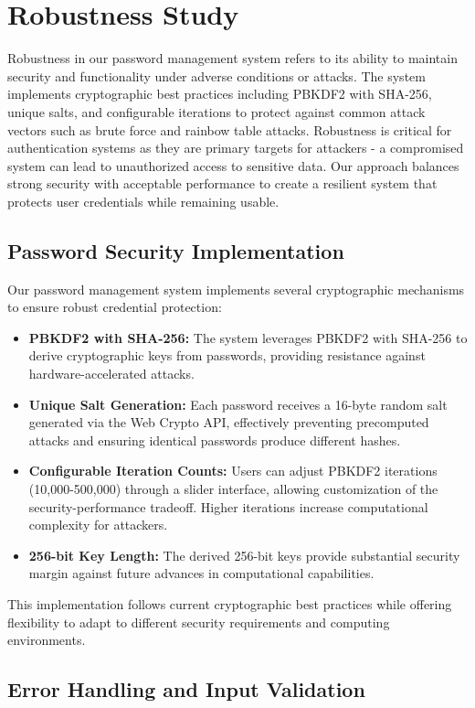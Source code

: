 \documentclass[11pt,a4paper]{article}
\begin{document}
\section{Robustness Study}

Robustness in our password management system refers to its ability to maintain security and functionality under adverse conditions or attacks. The system implements cryptographic best practices including PBKDF2 with SHA-256, unique salts, and configurable iterations to protect against common attack vectors such as brute force and rainbow table attacks. Robustness is critical for authentication systems as they are primary targets for attackers - a compromised system can lead to unauthorized access to sensitive data. Our approach balances strong security with acceptable performance to create a resilient system that protects user credentials while remaining usable.

\subsection{Password Security Implementation}
Our password management system implements several cryptographic mechanisms to ensure robust credential protection:
\begin{itemize}
  \item \textbf{PBKDF2 with SHA-256:} The system leverages PBKDF2 with SHA-256 to derive cryptographic keys from passwords, providing resistance against hardware-accelerated attacks.
  \item \textbf{Unique Salt Generation:} Each password receives a 16-byte random salt generated via the Web Crypto API, effectively preventing precomputed attacks and ensuring identical passwords produce different hashes.
  \item \textbf{Configurable Iteration Counts:} Users can adjust PBKDF2 iterations (10,000-500,000) through a slider interface, allowing customization of the security-performance tradeoff. Higher iterations increase computational complexity for attackers.
  \item \textbf{256-bit Key Length:} The derived 256-bit keys provide substantial security margin against future advances in computational capabilities.
\end{itemize}

This implementation follows current cryptographic best practices while offering flexibility to adapt to different security requirements and computing environments.

\subsection{Error Handling and Input Validation}
\end{document}
